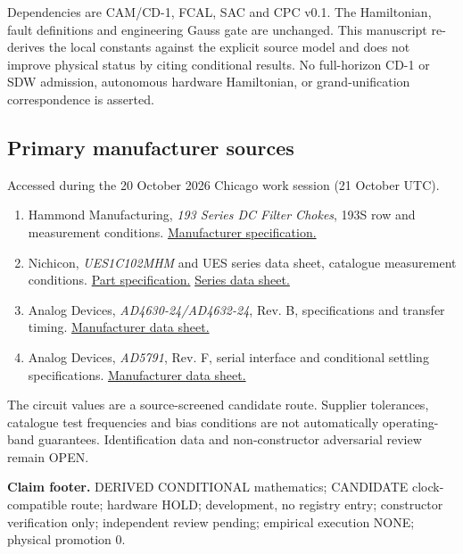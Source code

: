 \documentclass[10pt,a4paper]{article}
\begin{document}
Dependencies are CAM/CD-1, FCAL, SAC and CPC v0.1. The Hamiltonian, fault definitions and engineering Gauss gate are unchanged. This manuscript re-derives the local constants against the explicit source model and does not improve physical status by citing conditional results. No full-horizon CD-1 or SDW admission, autonomous hardware Hamiltonian, or grand-unification correspondence is asserted.

\subsection*{Primary manufacturer sources}
Accessed during the 20 October 2026 Chicago work session (21 October UTC).
\begin{enumerate}[leftmargin=*,itemsep=6pt]
\item Hammond Manufacturing, \emph{193 Series DC Filter Chokes}, 193S row and measurement conditions.
\href{https://www.hammfg.com/electronics/transformers/choke/193}{Manufacturer specification.}
\item Nichicon, \emph{UES1C102MHM} and UES series data sheet, catalogue measurement conditions.
\href{https://www.nichicon.com/en-us/part/ues1c102mhm/5398/}{Part specification.}
\href{https://www.nichicon.com/getmedia/069aeeb2-784e-41be-9621-207263576a6d/e-ues.pdf}{Series data sheet.}
\item Analog Devices, \emph{AD4630-24/AD4632-24}, Rev. B, specifications and transfer timing.
\href{https://www.analog.com/media/en/technical-documentation/data-sheets/ad4630-24_ad4632-24.pdf}{Manufacturer data sheet.}
\item Analog Devices, \emph{AD5791}, Rev. F, serial interface and conditional settling specifications.
\href{https://www.analog.com/media/en/technical-documentation/data-sheets/AD5791.pdf}{Manufacturer data sheet.}
\end{enumerate}
The circuit values are a source-screened candidate route. Supplier tolerances, catalogue test frequencies and bias conditions are not automatically operating-band guarantees. Identification data and non-constructor adversarial review remain OPEN.

\vfill\noindent\textbf{Claim footer.} DERIVED CONDITIONAL mathematics; CANDIDATE clock-compatible route; hardware HOLD; development, no registry entry; constructor verification only; independent review pending; empirical execution NONE; physical promotion 0.
\end{document}
